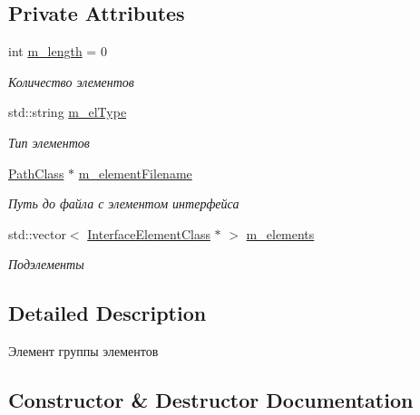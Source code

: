 \subsection*{Private Attributes}
\begin{DoxyCompactItemize}
\item 
int \hyperlink{class_group_element_class_ab90bd69909039a84624c012562a69b73}{m\+\_\+length} = 0
\begin{DoxyCompactList}\small\item\em Количество элементов \end{DoxyCompactList}\item 
std\+::string \hyperlink{class_group_element_class_a35ae439823d3ea85e209a0964df68ebd}{m\+\_\+el\+Type}
\begin{DoxyCompactList}\small\item\em Тип элементов \end{DoxyCompactList}\item 
\hyperlink{class_path_class}{Path\+Class} $\ast$ \hyperlink{class_group_element_class_a40acc8c47d8466129824b0ab892e504b}{m\+\_\+element\+Filename}
\begin{DoxyCompactList}\small\item\em Путь до файла с элементом интерфейса \end{DoxyCompactList}\item 
std\+::vector$<$ \hyperlink{class_interface_element_class}{Interface\+Element\+Class} $\ast$ $>$ \hyperlink{class_group_element_class_adb33d619437fc8dd20eaaa8bec55f692}{m\+\_\+elements}
\begin{DoxyCompactList}\small\item\em Подэлементы \end{DoxyCompactList}\end{DoxyCompactItemize}


\subsection{Detailed Description}
Элемент группы элементов 

\subsection{Constructor \& Destructor Documentation}
\mbox{\label{class_group_element_class_a7ff4c0c7752c6648899d032d1c477cda}} 
